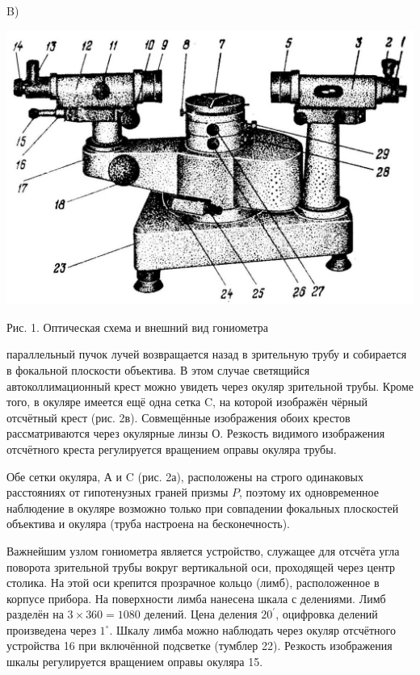 \documentclass[a4paper,12pt]{article} %
\begin{document}
B)

\begin{center}
\includegraphics[scale=0.2]{2023_04_02_a48ae02e429ba186bcd7g-2(1)}

Рис. 1. Оптическая схема и внешний вид гониометра

\end{center}

 параллельный пучок лучей возвращается назад в зрительную трубу и собирается в фокальной плоскости объектива. В этом случае светящийся автоколлимационный крест можно увидеть через окуляр зрительной трубы. Кроме того, в окуляре имеется ещё одна сетка C, на которой изображён чёрный отсчётный крест (рис. 2в). Совмещённые изображения обоих крестов рассматриваются через окулярные линзы О. Резкость видимого изображения отсчётного креста регулируется вращением оправы окуляра трубы.

Обе сетки окуляра, А и C (рис. 2а), расположены на строго одинаковых расстояниях от гипотенузных граней призмы $P$, поэтому их одновременное наблюдение в окуляре возможно только при совпадении фокальных плоскостей объектива и окуляра (труба настроена на бесконечность).

Важнейшим узлом гониометра является устройство, служащее для отсчёта угла поворота зрительной трубы вокруг вертикальной оси, проходящей через центр столика. На этой оси крепится прозрачное кольцо (лимб), расположенное в корпусе прибора. На поверхности лимба нанесена шкала с делениями. Лимб разделён на $3 \times 360=1080$ делений. Цена деления $20^{\prime}$, оцифровка делений произведена через $1^{\circ}$. Шкалу лимба можно наблюдать через окуляр отсчётного устройства 16 при включённой подсветке (тумблер 22). Резкость изображения шкалы регулируется вращением оправы окуляра 15.
\end{document}
